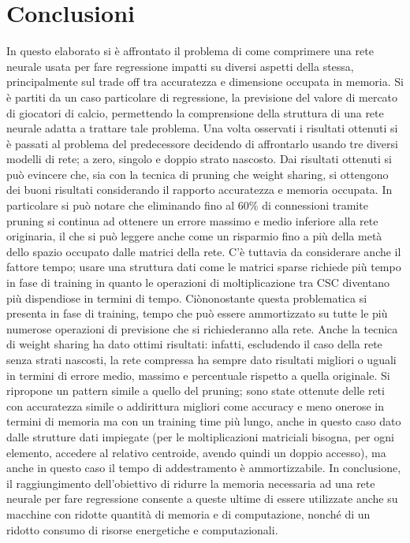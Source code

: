 \documentclass[12pt]{report}
\begin{document}
\chapter{Conclusioni}
In questo elaborato si è affrontato il problema di come comprimere una rete neurale usata per fare regressione impatti su diversi aspetti della stessa, principalmente sul trade off tra accuratezza e dimensione occupata in memoria. Si è partiti da un caso particolare di regressione, la previsione del valore di mercato di giocatori di calcio, permettendo la comprensione della struttura di una rete neurale adatta a trattare tale problema. Una volta osservati i risultati ottenuti si è passati al problema del predecessore decidendo di affrontarlo usando tre diversi modelli di rete; a zero, singolo e doppio strato nascosto. Dai risultati ottenuti si può evincere che, sia con la tecnica di pruning che weight sharing, si ottengono dei buoni risultati considerando il rapporto accuratezza e memoria occupata. In particolare si può notare che eliminando fino al 60\% di connessioni tramite pruning si continua ad ottenere un errore massimo e medio inferiore alla rete originaria, il che si può leggere anche come un risparmio fino a più della metà dello spazio occupato dalle matrici della rete. C'è tuttavia da considerare anche il fattore tempo; usare una struttura dati come le matrici sparse richiede più tempo in fase di training in quanto le operazioni di moltiplicazione tra CSC diventano più dispendiose in termini di tempo. Ciònonostante questa problematica si presenta in fase di training, tempo che può essere ammortizzato su tutte le più numerose operazioni di previsione che si richiederanno alla rete.
Anche la tecnica di weight sharing ha dato ottimi risultati: infatti, escludendo il caso della rete senza strati nascosti, la rete compressa ha sempre dato risultati migliori o uguali in termini di errore medio, massimo e percentuale rispetto a quella originale. Si ripropone un pattern simile a quello del pruning; sono state ottenute delle reti con accuratezza simile o addirittura migliori come accuracy e meno onerose in termini di memoria ma con un training time più lungo, anche in questo caso dato dalle strutture dati impiegate (per le moltiplicazioni matriciali bisogna, per ogni elemento, accedere al relativo centroide, avendo quindi un doppio accesso), ma anche in questo caso il tempo di addestramento è ammortizzabile.
In conclusione, il raggiungimento dell'obiettivo di ridurre la memoria necessaria ad una rete neurale per fare regressione consente a queste ultime di essere utilizzate anche su macchine con ridotte quantità di memoria e di computazione, nonché di un ridotto consumo di risorse energetiche e computazionali. 

{}

\end{document}
